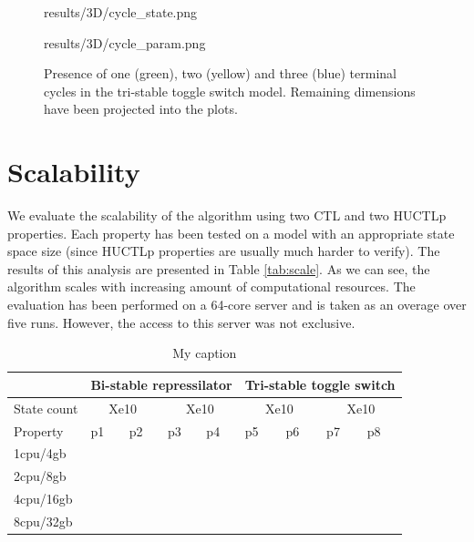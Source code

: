 \begin{figure}
	
	\begin{center}
		\begin{overpic}[width=.5\textwidth]{results/3D/cycle_state.png}\end{overpic}\hfill
		\begin{overpic}[width=.5\textwidth]{results/3D/cycle_param.png}\end{overpic}\hfill
	\end{center}
	
	\caption{Presence of one (green), two (yellow) and three (blue) terminal cycles in the tri-stable toggle switch model. Remaining dimensions have been projected into the plots.}
	\label{fig:triCycle}
\end{figure}

\section{Scalability}

We evaluate the scalability of the algorithm using two \ac{CTL} and two \ac{HUCTLp} properties. Each property has been tested on a model with an appropriate state space size (since \ac{HUCTLp} properties are usually much harder to verify). The results of this analysis are presented in Table \ref{tab:scale}. As we can see, the algorithm scales with increasing amount of computational resources. The evaluation has been performed on a 64-core server and is taken as an overage over five runs. However, the access to this server was not exclusive.

\begin{table}[]
	\centering
	\caption{My caption}
	\label{my-label}
	\begin{tabular}{l|llllllll}
		\hline
		& \multicolumn{4}{l}{Bi-stable repressilator}               & \multicolumn{4}{l|}{Tri-stable toggle switch}        \\ \hline
		State count & \multicolumn{2}{c}{Xe10} & \multicolumn{2}{c}{Xe10}       & \multicolumn{2}{c|}{Xe10} & \multicolumn{2}{c}{Xe10} \\ \cline{1-1}
		Property    & p1          & p2         & p3  & \multicolumn{1}{l|}{p4}  & p5          & p6          & p7          & p8         \\ \hline
		1cpu/4gb    &             &            &     &                          &             &             &             &            \\ \hline
		2cpu/8gb    &             &            &     &                          &             &             &             &            \\ \hline
		4cpu/16gb   &             &            &     &                          &             &             &             &            \\ \hline
		8cpu/32gb   &             &            &     &                          &             &             &             &           
	\end{tabular}
\end{table}
